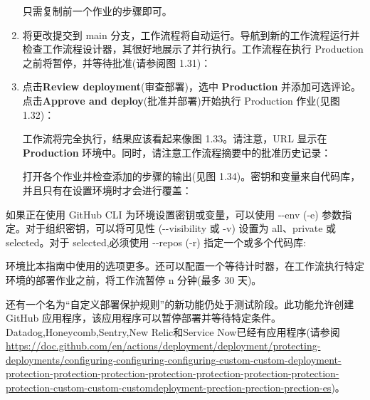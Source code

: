 \begin{enumerate}
只需复制前一个作业的步骤即可。

\item 
将更改提交到 main 分支，工作流程将自动运行。导航到新的工作流程运行并检查工作流程设计器，其很好地展示了并行执行。工作流程在执行 Production 之前将暂停，并等待批准(请参阅图 1.31)：


\item 
点击\textbf{Review deployment}(审查部署)，选中 \textbf{Production} 并添加可选评论。点击\textbf{Approve and deploy}(批准并部署)开始执行 Production 作业(见图 1.32)：


工作流将完全执行，结果应该看起来像图 1.33。请注意，URL 显示在 \textbf{Production} 环境中。同时，请注意工作流程摘要中的批准历史记录：


打开各个作业并检查添加的步骤的输出(见图 1.34)。密钥和变量来自代码库，并且只有在设置环境时才会进行覆盖：


\end{enumerate}


如果正在使用 GitHub CLI 为环境设置密钥或变量，可以使用 -{}-env (-e) 参数指定。对于组织密钥，可以将可见性 (-{}-visibility 或 -v) 设置为 all、private 或 selected。对于 selected,必须使用 -{}-repos (-r) 指定一个或多个代码库:


环境比本指南中使用的选项更多。还可以配置一个等待计时器，在工作流执行特定环境的部署作业之前，将工作流暂停 n 分钟(最多 30 天)。

还有一个名为“自定义部署保护规则”的新功能仍处于测试阶段。此功能允许创建 GitHub 应用程序，该应用程序可以暂停部署并等待特定条件。 Datadog,Honeycomb,Sentry,New Relic和Service Now已经有应用程序(请参阅\url{https://doc.github.com/en/actions/deployment/deployment/protecting-deployments/configuring-configuring-configuring-custom-custom-deployment-protection-protection-protection-protection-protection-protection-protection-protection-custom-custom-customdeployment-prection-prection-prection-es})。

